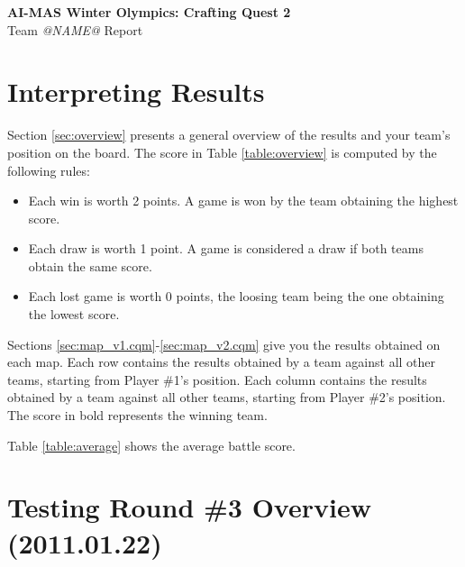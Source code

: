 \documentclass[a4paper,10pt]{article}
\begin{document}
\par {\huge \textbf{AI-MAS Winter Olympics: Crafting Quest 2}} \\
{\large Team \textit{@NAME@} Report} \\

\label{sec:results}
\section{Interpreting Results}

\par Section \ref{sec:overview} presents a general overview of the results and your team's position on the board. The score in Table \ref{table:overview} is computed by the following rules:
\begin{itemize}
	\item Each win is worth 2 points. A game is won by the team obtaining the highest score.
	\item Each draw is worth 1 point. A game is considered a draw if both teams obtain the same score.
	\item Each lost game is worth 0 points, the loosing team being the one obtaining the lowest score.
\end{itemize}

\par Sections \ref{sec:map_v1.cqm}-\ref{sec:map_v2.cqm} give you the results obtained on each map. Each row contains the results obtained by a team against all other teams, starting from Player \#1's position. Each column contains the results obtained by a team against all other teams, starting from Player \#2's position. The score in bold represents the winning team.

\par Table \ref{table:average} shows the average battle score.

\label{sec:overview}
\section{Testing Round \#3 Overview (2011.01.22)}
\end{document}
